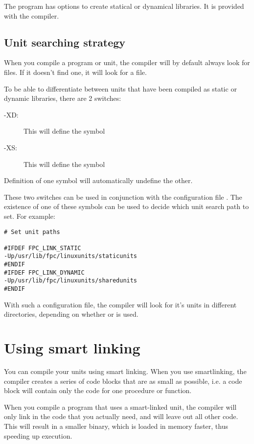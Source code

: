 The  program has options to create statical or dynamical
libraries. It is provided with the compiler.

\subsection{Unit searching strategy}

When you compile a program or unit, the compiler will by
default always look for  files. If it doesn't find one, it will
look for a  file.

To be able to differentiate between units that have been compiled as static
or dynamic libraries, there are 2 switches:

\begin{description}
\item [-XD:\ ] This will define the symbol 
\item [-XS:\ ] This will define the symbol 
\end{description}
Definition of one symbol will automatically undefine the other.

These two switches can be used in conjunction with the configuration file
. The existence of one of these symbols can be used to
decide which unit search path to set. For example:
\begin{verbatim}
# Set unit paths

#IFDEF FPC_LINK_STATIC
-Up/usr/lib/fpc/linuxunits/staticunits
#ENDIF
#IFDEF FPC_LINK_DYNAMIC
-Up/usr/lib/fpc/linuxunits/sharedunits
#ENDIF
\end{verbatim}
With such a configuration file, the compiler will look for it's units in
different directories, depending on whether  or  is used.

\section{Using smart linking}
\label{se:SmartLinking}

You can compile your units using smart linking. When you use smartlinking,
the compiler creates a series of code blocks that are as small as possible,
i.e. a code block will contain only the code for one procedure or function.

When you compile a program that uses a smart-linked unit, the compiler will
only link in the code that you actually need, and will leave out all other
code. This will result in a smaller binary, which is loaded in memory
faster, thus speeding up execution.

